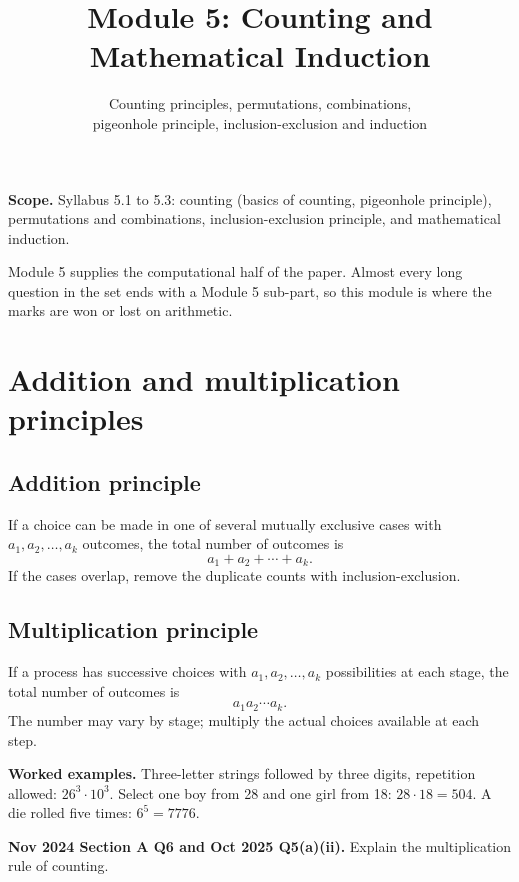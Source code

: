 \documentclass[11pt,a4paper]{article}
\title{\textbf{Module 5: Counting and Mathematical Induction}\\}
\author{\large Counting principles, permutations, combinations,\\pigeonhole principle, inclusion-exclusion and induction}
\date{}
\begin{document}
\maketitle

\begin{exambox}
\textbf{Scope.} Syllabus 5.1 to 5.3: counting (basics of counting, pigeonhole principle), permutations and combinations, inclusion-exclusion principle, and mathematical induction.

Module 5 supplies the computational half of the paper. Almost every long question in the set ends with a Module 5 sub-part, so this module is where the marks are won or lost on arithmetic.
\end{exambox}

\tableofcontents
\newpage

\section{Addition and multiplication principles}

\subsection{Addition principle}
If a choice can be made in one of several mutually exclusive cases with $a_1,a_2,\dots,a_k$ outcomes, the total number of outcomes is
\[
a_1+a_2+\cdots+a_k.
\]
If the cases overlap, remove the duplicate counts with inclusion-exclusion.

\subsection{Multiplication principle}
If a process has successive choices with $a_1,a_2,\dots,a_k$ possibilities at each stage, the total number of outcomes is
\[
a_1a_2\cdots a_k.
\]
The number may vary by stage; multiply the actual choices available at each step.

\begin{exambox}
\textbf{Worked examples.} Three-letter strings followed by three digits, repetition allowed: $26^3\cdot10^3$. Select one boy from 28 and one girl from 18: $28\cdot18=504$. A die rolled five times: $6^5=7776$.
\end{exambox}

\begin{pyqbox}
\textbf{Nov 2024 Section A Q6 and Oct 2025 Q5(a)(ii).} Explain the multiplication rule of counting.
\end{pyqbox}
\end{document}
